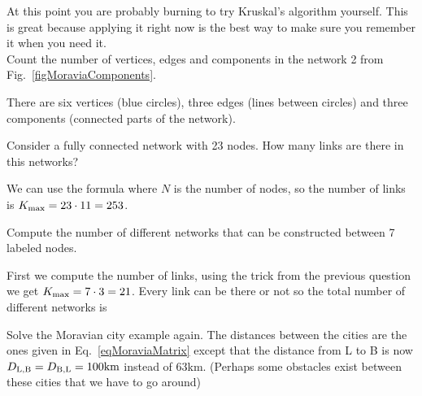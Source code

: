 



At this point you are probably burning to try Kruskal's algorithm yourself. This is great because applying it right now is the best way to make sure you remember it when you need it.\\

Count the number of vertices, edges and components in the network 2 from Fig.~\ref{figMoraviaComponents}. 


\solution
There are six vertices (blue circles), three edges (lines between circles) and three components (connected parts of the network). 



Consider a fully connected network with 23 nodes. How many links are there in this networks?


\solution
We can use the formula
where $N$ is the number of nodes, so the number of links is $K_{\rm max}=23\cdot 11 = 253$.



Compute the number of different networks that can be constructed between 7 labeled nodes.


\solution
First we compute the number of links, using the trick from the previous question we get $K_{\rm max}=7 \cdot 3=21$. Every link can be there or not so the total number of different networks is 







 Solve the Moravian city example again. The distances between the cities are the ones given in Eq.~\ref{eqMoraviaMatrix} except that the distance from L to B is now $D_{\rm L,\rm B}=D_{\rm B,\rm L}=100{\rm km}$ instead of 63km. (Perhaps some obstacles exist between these cities that we have to go around) 

